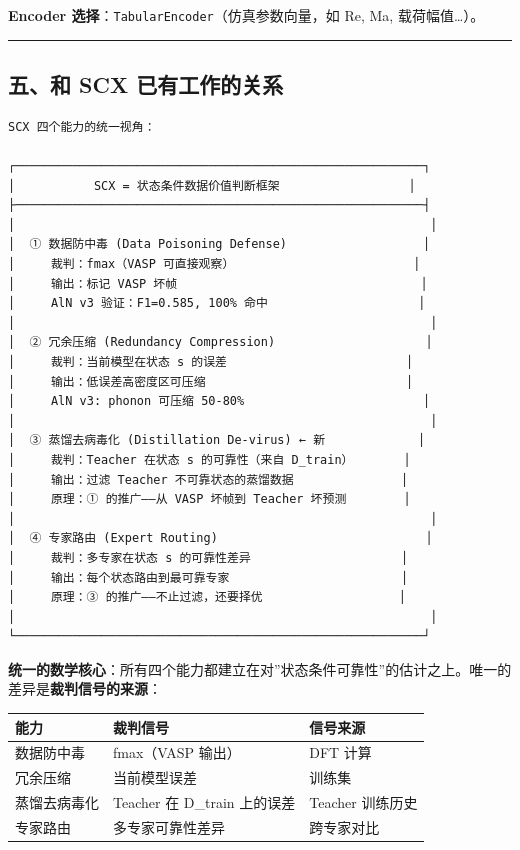 \documentclass[
  12pt,
]{ctexart}
\begin{document}
\textbf{Encoder 选择}：\texttt{TabularEncoder}（仿真参数向量，如 Re, Ma,
载荷幅值\ldots）。

\begin{center}\rule{0.5\linewidth}{0.5pt}\end{center}

\subsection{五、和 SCX
已有工作的关系}\label{ux4e94ux548c-scx-ux5df2ux6709ux5de5ux4f5cux7684ux5173ux7cfb}

\begin{verbatim}
SCX 四个能力的统一视角：

┌─────────────────────────────────────────────────────────┐
│           SCX = 状态条件数据价值判断框架                  │
├─────────────────────────────────────────────────────────┤
│                                                          │
│  ① 数据防中毒 (Data Poisoning Defense)                   │
│     裁判：fmax（VASP 可直接观察）                         │
│     输出：标记 VASP 坏帧                                  │
│     AlN v3 验证：F1=0.585, 100% 命中                     │
│                                                          │
│  ② 冗余压缩 (Redundancy Compression)                     │
│     裁判：当前模型在状态 s 的误差                         │
│     输出：低误差高密度区可压缩                            │
│     AlN v3: phonon 可压缩 50-80%                         │
│                                                          │
│  ③ 蒸馏去病毒化 (Distillation De-virus) ← 新             │
│     裁判：Teacher 在状态 s 的可靠性（来自 D_train）       │
│     输出：过滤 Teacher 不可靠状态的蒸馏数据               │
│     原理：① 的推广——从 VASP 坏帧到 Teacher 坏预测        │
│                                                          │
│  ④ 专家路由 (Expert Routing)                             │
│     裁判：多专家在状态 s 的可靠性差异                     │
│     输出：每个状态路由到最可靠专家                        │
│     原理：③ 的推广——不止过滤，还要择优                   │
│                                                          │
└─────────────────────────────────────────────────────────┘
\end{verbatim}

\textbf{统一的数学核心}：所有四个能力都建立在对''状态条件可靠性''的估计之上。唯一的差异是\textbf{裁判信号的来源}：

\begin{longtable}[]{@{}lll@{}}
\toprule\noalign{}
能力 & 裁判信号 & 信号来源 \\
\midrule\noalign{}
\endhead
\bottomrule\noalign{}
\endlastfoot
数据防中毒 & fmax（VASP 输出） & DFT 计算 \\
冗余压缩 & 当前模型误差 & 训练集 \\
蒸馏去病毒化 & Teacher 在 D\_train 上的误差 & Teacher 训练历史 \\
专家路由 & 多专家可靠性差异 & 跨专家对比 \\
\end{longtable}
\end{document}

